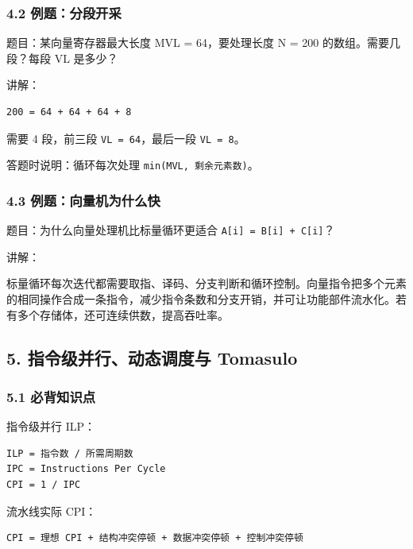 \documentclass[
]{ctexart}
\newcommand{\passthrough}[1]{#1}
\begin{document}
\subsubsection{4.2
例题：分段开采}\label{ux4f8bux9898ux5206ux6bb5ux5f00ux91c7}

题目：某向量寄存器最大长度 MVL = 64，要处理长度 N = 200
的数组。需要几段？每段 VL 是多少？

讲解：

\begin{lstlisting}
200 = 64 + 64 + 64 + 8
\end{lstlisting}

需要 4 段，前三段 \passthrough{\lstinline!VL = 64!}，最后一段
\passthrough{\lstinline!VL = 8!}。

答题时说明：循环每次处理
\passthrough{\lstinline!min(MVL, 剩余元素数)!}。

\subsubsection{4.3
例题：向量机为什么快}\label{ux4f8bux9898ux5411ux91cfux673aux4e3aux4ec0ux4e48ux5feb}

题目：为什么向量处理机比标量循环更适合
\passthrough{\lstinline!A[i] = B[i] + C[i]!}？

讲解：

标量循环每次迭代都需要取指、译码、分支判断和循环控制。向量指令把多个元素的相同操作合成一条指令，减少指令条数和分支开销，并可让功能部件流水化。若有多个存储体，还可连续供数，提高吞吐率。

\subsection{5. 指令级并行、动态调度与
Tomasulo}\label{ux6307ux4ee4ux7ea7ux5e76ux884cux52a8ux6001ux8c03ux5ea6ux4e0e-tomasulo}

\subsubsection{5.1 必背知识点}\label{ux5fc5ux80ccux77e5ux8bc6ux70b9-4}

指令级并行 ILP：

\begin{lstlisting}
ILP = 指令数 / 所需周期数
IPC = Instructions Per Cycle
CPI = 1 / IPC
\end{lstlisting}

流水线实际 CPI：

\begin{lstlisting}
CPI = 理想 CPI + 结构冲突停顿 + 数据冲突停顿 + 控制冲突停顿
\end{lstlisting}
\end{document}
